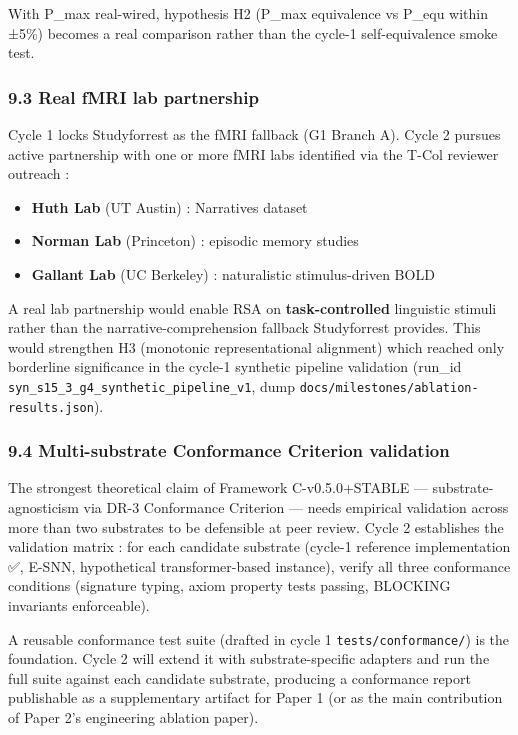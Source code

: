 \documentclass[
]{article}
\providecommand{\tightlist}{%
  \setlength{\itemsep}{0pt}\setlength{\parskip}{0pt}}
\begin{document}
With P\_max real-wired, hypothesis H2 (P\_max equivalence vs P\_equ
within ±5\%) becomes a real comparison rather than the cycle-1
self-equivalence smoke test.

\subsubsection{9.3 Real fMRI lab
partnership}\label{real-fmri-lab-partnership}

Cycle 1 locks Studyforrest as the fMRI fallback (G1 Branch A). Cycle 2
pursues active partnership with one or more fMRI labs identified via the
T-Col reviewer outreach :

\begin{itemize}
\tightlist
\item
  \textbf{Huth Lab} (UT Austin) : Narratives dataset
\item
  \textbf{Norman Lab} (Princeton) : episodic memory studies
\item
  \textbf{Gallant Lab} (UC Berkeley) : naturalistic stimulus-driven BOLD
\end{itemize}

A real lab partnership would enable RSA on \textbf{task-controlled}
linguistic stimuli rather than the narrative-comprehension fallback
Studyforrest provides. This would strengthen H3 (monotonic
representational alignment) which reached only borderline significance
in the cycle-1 synthetic pipeline validation (run\_id
\texttt{syn\_s15\_3\_g4\_synthetic\_pipeline\_v1}, dump
\texttt{docs/milestones/ablation-results.json}).

\subsubsection{9.4 Multi-substrate Conformance Criterion
validation}\label{multi-substrate-conformance-criterion-validation}

The strongest theoretical claim of Framework C-v0.5.0+STABLE ---
substrate-agnosticism via DR-3 Conformance Criterion --- needs empirical
validation across more than two substrates to be defensible at peer
review. Cycle 2 establishes the validation matrix : for each candidate
substrate (cycle-1 reference implementation ✅, E-SNN, hypothetical
transformer-based instance), verify all three conformance conditions
(signature typing, axiom property tests passing, BLOCKING invariants
enforceable).

A reusable conformance test suite (drafted in cycle 1
\texttt{tests/conformance/}) is the foundation. Cycle 2 will extend it
with substrate-specific adapters and run the full suite against each
candidate substrate, producing a conformance report publishable as a
supplementary artifact for Paper 1 (or as the main contribution of Paper
2's engineering ablation paper).
\end{document}
